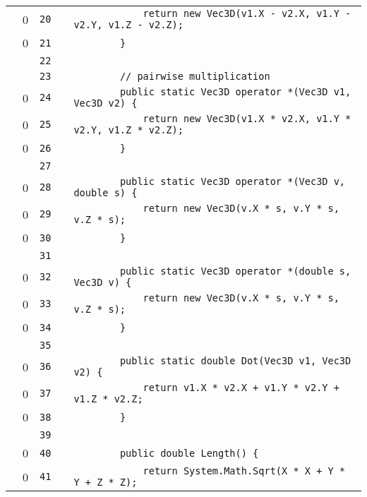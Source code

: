 \documentclass[a4paper,landscape,10pt]{article}
\begin{document}
\begin{longtable}[l]{lrrll}
\cellcolor{red} & 0 & \verb~20~ & & \verb~            return new Vec3D(v1.X - v2.X, v1.Y - v2.Y, v1.Z - v2.Z);~\\
\cellcolor{red} & 0 & \verb~21~ & & \verb~        }~\\
\cellcolor{gray} &  & \verb~22~ & & \verb~~\\
\cellcolor{gray} &  & \verb~23~ & & \verb~        // pairwise multiplication~\\
\cellcolor{red} & 0 & \verb~24~ & & \verb~        public static Vec3D operator *(Vec3D v1, Vec3D v2) {~\\
\cellcolor{red} & 0 & \verb~25~ & & \verb~            return new Vec3D(v1.X * v2.X, v1.Y * v2.Y, v1.Z * v2.Z);~\\
\cellcolor{red} & 0 & \verb~26~ & & \verb~        }~\\
\cellcolor{gray} &  & \verb~27~ & & \verb~~\\
\cellcolor{red} & 0 & \verb~28~ & & \verb~        public static Vec3D operator *(Vec3D v, double s) {~\\
\cellcolor{red} & 0 & \verb~29~ & & \verb~            return new Vec3D(v.X * s, v.Y * s, v.Z * s);~\\
\cellcolor{red} & 0 & \verb~30~ & & \verb~        }~\\
\cellcolor{gray} &  & \verb~31~ & & \verb~~\\
\cellcolor{red} & 0 & \verb~32~ & & \verb~        public static Vec3D operator *(double s, Vec3D v) {~\\
\cellcolor{red} & 0 & \verb~33~ & & \verb~            return new Vec3D(v.X * s, v.Y * s, v.Z * s);~\\
\cellcolor{red} & 0 & \verb~34~ & & \verb~        }~\\
\cellcolor{gray} &  & \verb~35~ & & \verb~~\\
\cellcolor{red} & 0 & \verb~36~ & & \verb~        public static double Dot(Vec3D v1, Vec3D v2) {~\\
\cellcolor{red} & 0 & \verb~37~ & & \verb~            return v1.X * v2.X + v1.Y * v2.Y + v1.Z * v2.Z;~\\
\cellcolor{red} & 0 & \verb~38~ & & \verb~        }~\\
\cellcolor{gray} &  & \verb~39~ & & \verb~~\\
\cellcolor{red} & 0 & \verb~40~ & & \verb~        public double Length() {~\\
\cellcolor{red} & 0 & \verb~41~ & & \verb~            return System.Math.Sqrt(X * X + Y * Y + Z * Z);~\\

\end{longtable}
\end{document}
